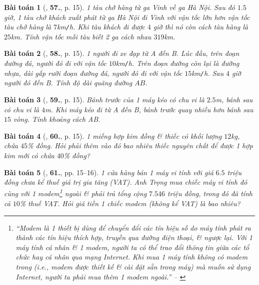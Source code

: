 \documentclass{article}
\numberwithin{equation}{section}
\newtheorem{baitoan}{Bài toán}
\begin{document}
\begin{baitoan}[\cite{SBT_Toan_8_tap_2}, \textbf{57.}, p. 15]
	1 tàu chở hàng từ ga Vinh về ga Hà Nội. Sau đó $1.5$ giờ, 1 tàu chở khách xuất phát từ ga Hà Nội đi Vinh với vận tốc lớn hơn vận tốc tàu chở hàng là $7$\emph{km\texttt{/}h}. Khi tàu khách đi được $4$ giờ thì nó còn cách tàu hàng là $25$\emph{km}. Tính vận tốc mỗi tàu biết 2 ga cách nhau $319$\emph{km}.
\end{baitoan}

\begin{baitoan}[\cite{SBT_Toan_8_tap_2}, \textbf{58.}, p. 15]
	1 người đi xe đạp từ A đến B. Lúc đầu, trên đoạn đường đá, người đó đi với vận tốc $10$\emph{km\texttt{/}h}. Trên đoạn đường còn lại là đường nhựa, dài gấp rưỡi đoạn đường đá, người đó đi với vận tốc $15$\emph{km\texttt{/}h}. Sau $4$ giờ người đó đến B. Tính độ dài quãng đường $AB$.
\end{baitoan}

\begin{baitoan}[\cite{SBT_Toan_8_tap_2}, \textbf{59.}, p. 15]
	Bánh trước của 1 máy kéo có chu vi là $2.5$\emph{m}, bánh sau có chu vi là $4$\emph{m}. Khi máy kéo đi từ A đến B, bánh trước quay nhiều hơn bánh sau $15$ vòng. Tính khoảng cách AB.
\end{baitoan}

\begin{baitoan}[\cite{SBT_Toan_8_tap_2}, \textbf{60.}, p. 15]
	1 miếng hợp kim đồng \& thiếc có khối lượng $12$\emph{kg}, chứa $45$\% đồng. Hỏi phải thêm vào đó bao nhiêu thiếc nguyên chất để được 1 hợp kim mới có chứa $40$\% đồng?
\end{baitoan}

\begin{baitoan}[\cite{SBT_Toan_8_tap_2}, \textbf{61.}, pp. 15--16]
	1 cửa hàng bán 1 máy vi tính với giá $6.5$ triệu đồng chưa kể thuế giá trị gia tăng (VAT). Anh Trọng mua chiếc máy vi tính đó cùng với 1 modem\footnote{``Modem là 1 thiết bị dùng để chuyển đổi các tín hiệu số do máy tính phát ra thành các tín hiệu thích hợp, truyền qua đường điện thoại, \& ngược lại. Với 1 máy tính cá nhân \& 1 modem, người ta có thể trao đổi thông tin giữa các tổ chức hay cá nhân qua mạng Internet. Khi mua 1 máy tính không có modem trong (i.e., modem được thiết kế \& cài đặt sẵn trong máy) mà muốn sử dụng Internet, người ta phải mua thêm 1 modem ngoài.'' -- \cite[p. 15]{SBT_Toan_8_tap_2}} ngoài \& phải trả tổng cộng $7.546$ triệu đồng, trong đó đã tính cả $10$\% thuế VAT. Hỏi giá tiền 1 chiếc modem (không kể VAT) là bao nhiêu?
\end{baitoan}
\end{document}
